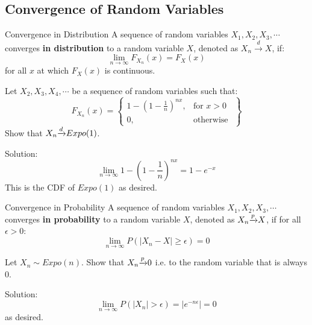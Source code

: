 \subsection{Convergence of Random Variables}
\begin{defn}{Convergence in Distribution}{}
A sequence of random variables \(X_1, X_2, X_3, \cdots\) converges \textbf{in distribution} to a random variable \(X\), denoted as \(X_n \xrightarrow{d} X\), if:
\begin{equation*}
  \lim_{n \to \infty}F_{X_n}(x) = F_X(x)
\end{equation*}
for all \(x\) at which \(F_X(x)\) is continuous.

\end{defn}
\begin{exmp}{}{}
Let \(X_2, X_3, X_4, \cdots\) be a sequence of random variables such that:
\begin{equation*}
  F_{X_n}(x) = 
  \left.
  \begin{cases}
    1 - (1 - \frac{1}{n})^{nx}, & \text{for } x > 0 \\
    0, & \text{otherwise } 
  \end{cases}
  \right\}
\end{equation*}
Show that \(X_n {\xrightarrow{d}} Expo(1)\).\newline 

Solution: 
\begin{equation*}
  \lim_{n\to\infty}1 - (1 - \frac{1}{n})^{nx} = 1 - e^{-x}
\end{equation*}
This is the CDF of \(Expo(1)\) as desired.
\end{exmp}
\begin{defn}{Convergence in Probability}{}
A sequence of random variables \(X_1, X_2, X_3, \cdots\) converges \textbf{in probability} to a random variable \(X\), denoted as \(X_n {\xrightarrow{p}} X\), if for all \(\epsilon > 0\):
\begin{equation*}
  \lim_{n \to \infty}P(|X_n - X| \geq \epsilon) = 0
\end{equation*}

\end{defn}

\begin{exmp}{}{}
Let \(X_n \sim Expo(n)\). Show that \(X_n {\xrightarrow{p}} 0\) i.e. to the random variable that is always 0. \newline 

Solution:
\begin{equation*}
  \lim_{n \to \infty} P(|X_n| > \epsilon) =|e^{-n\epsilon}| = 0
\end{equation*}
as desired.

\end{exmp}

